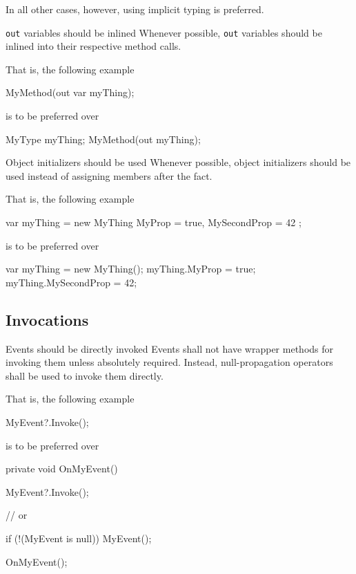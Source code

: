 \documentclass[11pt,a4paper]{article}
\begin{document}
In all other cases, however, using implicit typing is preferred.

\begin{should}{\texttt{out} variables should be inlined}
Whenever possible, \texttt{out} variables should be inlined into their respective method calls.
\end{should}

That is, the following example 
\begin{code}
MyMethod(out var myThing);
\end{code}

is to be preferred over

\begin{code}
MyType myThing;
MyMethod(out myThing);
\end{code}

\begin{should}{Object initializers should be used}
Whenever possible, object initializers should be used instead of assigning members after the fact.
\end{should}

That is, the following example 
\begin{code}
var myThing = new MyThing
{
    MyProp = true,
    MySecondProp = 42
};
\end{code}

is to be preferred over

\begin{code}
var myThing = new MyThing();
myThing.MyProp = true;
myThing.MySecondProp = 42;
\end{code}

\subsection{Invocations}
\begin{should}{Events should be directly invoked}
Events shall not have wrapper methods for invoking them unless absolutely required. Instead, null-propagation operators shall be used to invoke them directly.
\end{should}

That is, the following example 
\begin{code}
MyEvent?.Invoke();
\end{code}

is to be preferred over

\begin{code}
private void OnMyEvent()
{
    MyEvent?.Invoke();
    
    // or
    
    if (!(MyEvent is null))
    {
        MyEvent();
    }
}

OnMyEvent();
\end{code}
\end{document}
